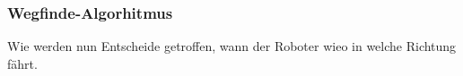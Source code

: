 \documentclass[main.tex]{subfiles} %
\begin{document}

\subsubsection{Wegfinde-Algorhitmus}

Wie werden nun Entscheide getroffen, wann der Roboter wieo in welche Richtung
fährt.
\end{document}
